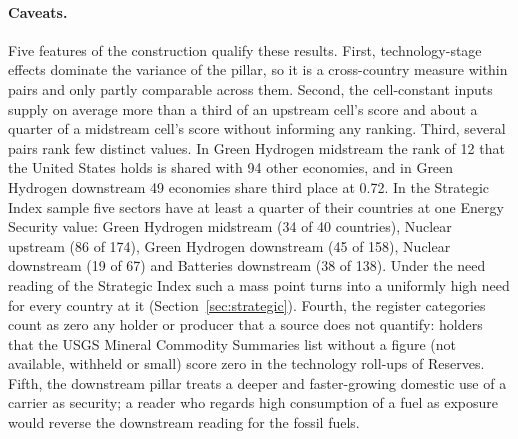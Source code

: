 \paragraph{Caveats.} Five features of the construction qualify these results. First,
technology-stage effects dominate the variance of the pillar, so it is a cross-country measure
within pairs and only partly comparable across them. Second, the cell-constant inputs supply on
average more than a third of an upstream cell's score and about a quarter of a midstream cell's
score without informing any ranking. Third, several pairs rank few distinct values. In Green
Hydrogen midstream the rank of 12 that the United States holds is shared with 94 other
economies, and in Green Hydrogen downstream 49 economies share third place at 0.72. In the
Strategic Index sample five sectors have at least a quarter of their countries at one Energy
Security value: Green Hydrogen midstream (34 of 40 countries), Nuclear upstream (86 of 174),
Green Hydrogen downstream (45 of 158), Nuclear downstream (19 of 67) and Batteries downstream
(38 of 138). Under the need reading of the Strategic Index such a mass point turns into a
uniformly high need for every country at it (Section~\ref{sec:strategic}). Fourth, the register
categories count as zero any holder or producer that a source does not quantify: holders that
the USGS Mineral Commodity Summaries list without a figure (not available, withheld or small)
score zero in the technology roll-ups of Reserves. Fifth, the downstream pillar treats a deeper
and faster-growing domestic use of a carrier as security; a reader who regards high consumption
of a fuel as exposure would reverse the downstream reading for the fossil fuels.
